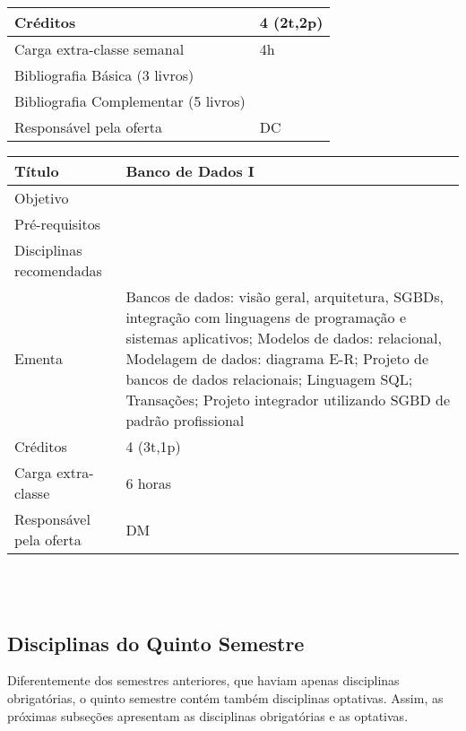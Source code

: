 \begin{center}
\begin{tabular}{|p{4.5cm}|p{10.0cm}|}
\\ \hline
Créditos & 4 (2t,2p) 

\\ \hline
Carga extra-classe semanal & 4h


\\

\hline 
Bibliografia Básica (3 livros) &

\\

\hline
Bibliografia Complementar (5 livros) &


\\ \hline
Responsável pela oferta & DC \\ \hline
\end{tabular}
\end{center}



\begin{tabular}{|p{4.5cm}|p{10.0cm}|} \hline
Título & Banco de Dados I \\ \hline
Objetivo &  \\ \hline
Pré-requisitos &  \\ \hline
Disciplinas recomendadas &  \\ \hline
Ementa & Bancos de dados: visão geral, arquitetura, SGBDs, integração com linguagens de programação e sistemas aplicativos; Modelos de dados: relacional, Modelagem de dados: diagrama E-R; Projeto de bancos de dados relacionais; Linguagem
SQL; Transações; Projeto integrador utilizando SGBD de padrão profissional \\ \hline
Créditos & 4 (3t,1p) \\ \hline
Carga extra-classe & 6 horas \\ \hline
Responsável pela oferta & DM \\ \hline
\end{tabular}
\\
\\


\subsection{Disciplinas do Quinto Semestre}

Diferentemente dos semestres anteriores, que haviam apenas disciplinas obrigatórias, o quinto semestre contém também disciplinas optativas. Assim, as próximas subseções apresentam as disciplinas obrigatórias e as optativas. 

